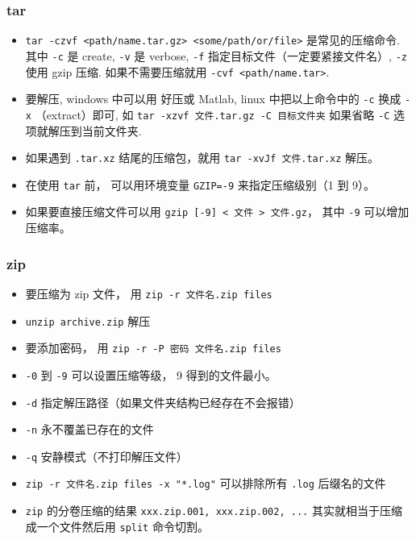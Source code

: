 \subsubsection{tar}
\begin{itemize}
\item \verb`tar -czvf <path/name.tar.gz> <some/path/or/file>` 是常见的压缩命令. 其中 \verb`-c` 是 create, \verb`-v` 是 verbose, \verb`-f` 指定目标文件（一定要紧接文件名）, \verb`-z` 使用 gzip 压缩. 如果不需要压缩就用 \verb`-cvf <path/name.tar>`.
\item 要解压, windows 中可以用 好压或 Matlab, linux 中把以上命令中的 \verb`-c` 换成 \verb`-x` （extract）即可, 如 \verb`tar -xzvf 文件.tar.gz -C 目标文件夹` 如果省略 \verb`-C` 选项就解压到当前文件夹.
\item 如果遇到 \verb`.tar.xz` 结尾的压缩包，就用 \verb`tar -xvJf 文件.tar.xz` 解压。
\item 在使用 \verb`tar` 前， 可以用环境变量 \verb`GZIP=-9` 来指定压缩级别（1 到 9）。
\item 如果要直接压缩文件可以用 \verb`gzip [-9] < 文件 > 文件.gz`， 其中 \verb`-9` 可以增加压缩率。
\end{itemize}

\subsubsection{zip}
\begin{itemize}
\item 要压缩为 zip 文件， 用 \verb`zip -r 文件名.zip files`
\item \verb`unzip archive.zip` 解压
\item 要添加密码， 用 \verb`zip -r -P 密码 文件名.zip files`
\item \verb`-0` 到 \verb`-9` 可以设置压缩等级， 9 得到的文件最小。
\item \verb`-d` 指定解压路径（如果文件夹结构已经存在不会报错）
\item \verb`-n` 永不覆盖已存在的文件
\item \verb`-q` 安静模式（不打印解压文件）
\item \verb`zip -r 文件名.zip files -x "*.log"` 可以排除所有 \verb`.log` 后缀名的文件
\item \verb`zip` 的分卷压缩的结果 \verb`xxx.zip.001, xxx.zip.002, ...` 其实就相当于压缩成一个文件然后用 \verb`split` 命令切割。
\end{itemize}

